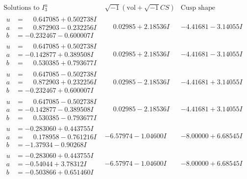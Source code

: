 \documentclass[1p]{elsarticle_modified}
\theoremstyle{definition}
\newcommand{\I}{\sqrt{-1}}
\begin{document}
$$\begin{array}{c|c|c}  
\text{Solutions to }I^u_{3}& \I (\text{vol} + \sqrt{-1}CS) & \text{Cusp shape}\\
 \hline 
\begin{aligned}
u &= \phantom{-}0.647085 + 0.502738 I \\
a &= \phantom{-}0.872903 - 0.232256 I \\
b &= -0.232467 - 0.600007 I\end{aligned}
 & \phantom{-}0.02985 + 2.18536 I & -4.41681 - 3.14055 I \\ \hline\begin{aligned}
u &= \phantom{-}0.647085 + 0.502738 I \\
a &= -0.142877 + 0.389508 I \\
b &= \phantom{-}0.530385 + 0.793677 I\end{aligned}
 & \phantom{-}0.02985 + 2.18536 I & -4.41681 - 3.14055 I \\ \hline\begin{aligned}
u &= \phantom{-}0.647085 - 0.502738 I \\
a &= \phantom{-}0.872903 + 0.232256 I \\
b &= -0.232467 + 0.600007 I\end{aligned}
 & \phantom{-}0.02985 - 2.18536 I & -4.41681 + 3.14055 I \\ \hline\begin{aligned}
u &= \phantom{-}0.647085 - 0.502738 I \\
a &= -0.142877 - 0.389508 I \\
b &= \phantom{-}0.530385 - 0.793677 I\end{aligned}
 & \phantom{-}0.02985 - 2.18536 I & -4.41681 + 3.14055 I \\ \hline\begin{aligned}
u &= -0.283060 + 0.443755 I \\
a &= \phantom{-}0.178958 - 0.761216 I \\
b &= -1.37934 - 0.90268 I\end{aligned}
 & -6.57974 - 1.04600 I & -8.00000 + 6.68545 I \\ \hline\begin{aligned}
u &= -0.283060 + 0.443755 I \\
a &= -0.54044 + 3.78312 I \\
b &= -0.503866 + 0.651460 I\end{aligned}
 & -6.57974 - 1.04600 I & -8.00000 + 6.68545 I \\ \hline\begin{aligned}

\end{aligned}
\end{array}$$
\end{document}
